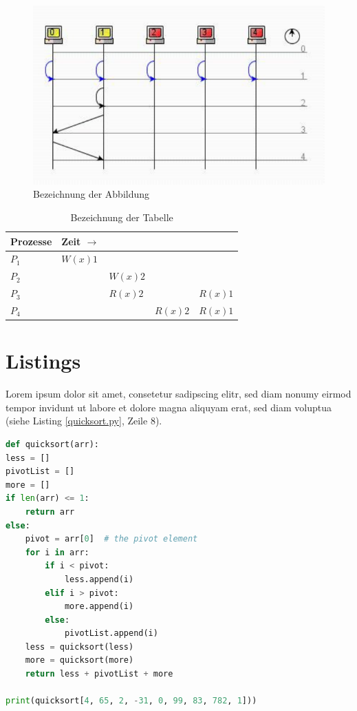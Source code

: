 \begin{figure} %
	\centering
	\includegraphics{images/sequence.pdf}
	\caption{Bezeichnung der Abbildung}
	\label{a1}
\end{figure}

\begin{table} %
	\centering
	\begin{tabular}{l | l l l l}
		\textbf{Prozesse} & \textbf{Zeit} $\rightarrow$ \\
		\hline
		$P_{1}$ & $W(x)1$ \\
		$P_{2}$ & & $W(x)2$ \\
		$P_{3}$ & & $R(x)2$ & & $R(x)1$\\
		$P_{4}$ & & & $R(x)2$ & $R(x)1$\\
	\end{tabular}
	\caption{Bezeichnung der Tabelle}
	\label{t1}
\end{table}

\section{Listings}

Lorem ipsum dolor sit amet, consetetur sadipscing elitr, sed diam nonumy eirmod tempor invidunt ut labore et dolore magna aliquyam erat, sed diam voluptua (siehe Listing \ref{quicksort.py}, Zeile 8).

\begin{lstlisting}[language=Python, caption={Quicksort-Implementierung in Python}, label={quicksort.py}]
def quicksort(arr):
less = []
pivotList = []
more = []
if len(arr) <= 1:
	return arr
else:
	pivot = arr[0]	# the pivot element
	for i in arr:
		if i < pivot:
			less.append(i)
		elif i > pivot:
			more.append(i)
		else:
			pivotList.append(i)
	less = quicksort(less)
	more = quicksort(more)
	return less + pivotList + more

print(quicksort[4, 65, 2, -31, 0, 99, 83, 782, 1]))
\end{lstlisting}

